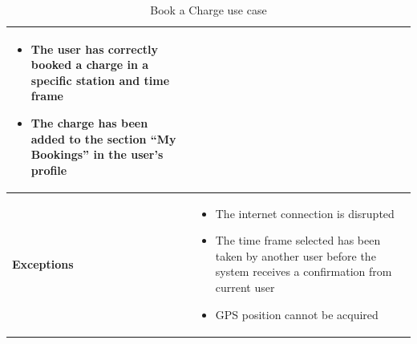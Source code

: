 \documentclass[12pt]{report}
\begin{document}
\begin{table}[h]
\begin{adjustbox}{max width=0.89\textwidth}
\begin{tabular}{ |p{4cm}|p{11cm}|  }
                \begin{itemize}
                    \item The user has correctly booked a charge in a specific station and time frame
                    \item The charge has been added to the section “My Bookings” in the user’s profile
                \end{itemize}\\
        \hline
            \textbf{Exceptions} &
                \begin{itemize}
                    \item The internet connection is disrupted
                    \item The time frame selected has been taken by another user before the system receives a confirmation from current user
                    \item GPS position cannot be acquired
                \end{itemize}\\
        \hline
        \end{tabular}
        \end{adjustbox}
        \caption{\label{demo-table}Book a Charge use case}
    \end{table}
\clearpage
\end{document}
